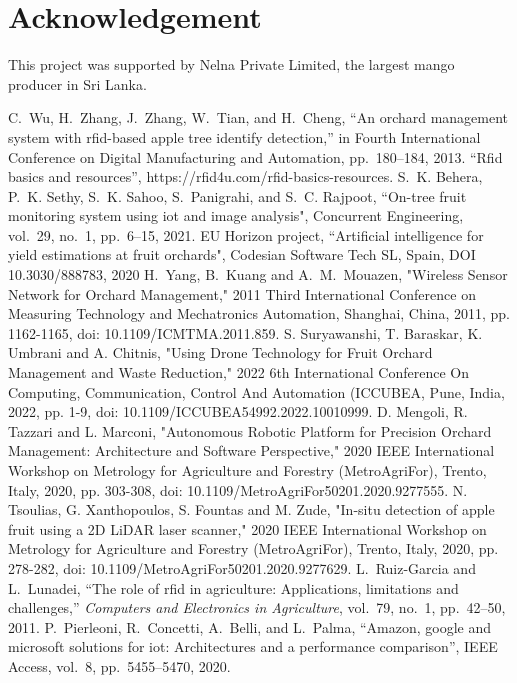 \documentclass[journal]{IEEEtran}
\begin{document}
\section{Acknowledgement}
This project was supported by Nelna Private Limited, the largest mango producer in Sri Lanka.
\balance
\begin{thebibliography}{1}
C.~Wu, H.~Zhang, J.~Zhang, W.~Tian, and H.~Cheng, ``An orchard management system with rfid-based apple tree identify detection,'' in Fourth International Conference on Digital Manufacturing and Automation, pp.~180--184, 2013.
``Rfid basics and resources'', https://rfid4u.com/rfid-basics-resources.
S.~K. Behera, P.~K. Sethy, S.~K. Sahoo, S.~Panigrahi, and S.~C. Rajpoot, ``On-tree fruit monitoring system using iot and image analysis", Concurrent Engineering, vol.~29, no.~1, pp.~6--15, 2021.
EU Horizon project, ``Artificial intelligence for yield estimations at fruit orchards", Codesian Software Tech SL, Spain, DOI 10.3030/888783, 2020
H.~Yang, B.~Kuang and A.~M.~Mouazen, "Wireless Sensor Network for Orchard Management," 2011 Third International Conference on Measuring Technology and Mechatronics Automation, Shanghai, China, 2011, pp. 1162-1165, doi: 10.1109/ICMTMA.2011.859.
S. Suryawanshi, T. Baraskar, K. Umbrani and A. Chitnis, "Using Drone Technology for Fruit Orchard Management and Waste Reduction," 2022 6th International Conference On Computing, Communication, Control And Automation (ICCUBEA, Pune, India, 2022, pp. 1-9, doi: 10.1109/ICCUBEA54992.2022.10010999.
D. Mengoli, R. Tazzari and L. Marconi, "Autonomous Robotic Platform for Precision Orchard Management: Architecture and Software Perspective," 2020 IEEE International Workshop on Metrology for Agriculture and Forestry (MetroAgriFor), Trento, Italy, 2020, pp. 303-308, doi: 10.1109/MetroAgriFor50201.2020.9277555.
N. Tsoulias, G. Xanthopoulos, S. Fountas and M. Zude, "In-situ detection of apple fruit using a 2D LiDAR laser scanner," 2020 IEEE International Workshop on Metrology for Agriculture and Forestry (MetroAgriFor), Trento, Italy, 2020, pp. 278-282, doi: 10.1109/MetroAgriFor50201.2020.9277629.
L.~Ruiz-Garcia and L.~Lunadei, ``The role of rfid in agriculture: Applications, limitations and challenges,'' {\em Computers and Electronics in Agriculture}, vol.~79, no.~1, pp.~42--50, 2011.
P.~Pierleoni, R.~Concetti, A.~Belli, and L.~Palma, ``Amazon, google and
microsoft solutions for iot: Architectures and a performance comparison'', IEEE Access, vol.~8, pp.~5455--5470, 2020.

\end{thebibliography}
\end{document}
